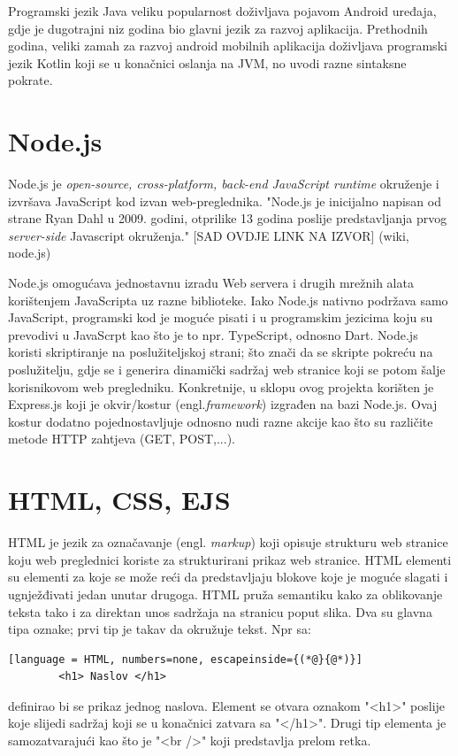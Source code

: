 \documentclass[times, utf8, zavrsni, numeric]{fer}
\begin{document}
	Programski jezik Java veliku popularnost doživljava pojavom Android uređaja, gdje je dugotrajni niz godina bio glavni jezik za razvoj aplikacija. Prethodnih godina, veliki zamah za razvoj android mobilnih aplikacija doživljava programski jezik 
	Kotlin koji se u konačnici oslanja na JVM, no uvodi razne sintaksne pokrate. 
	
	
	
	\section{Node.js}
	Node.js je \textit{open-source, cross-platform, back-end JavaScript runtime} okruženje i izvršava JavaScript kod izvan web-preglednika. "Node.js je inicijalno napisan od strane  Ryan Dahl u 2009. godini, otprilike 13 godina poslije predstavljanja
	prvog  \textit{server-side} Javascript okruženja." [SAD OVDJE LINK NA IZVOR] (wiki, node.js)
	
	Node.js omogućava jednostavnu izradu Web servera i drugih mrežnih alata korištenjem JavaScripta uz razne biblioteke. Iako Node.js nativno podržava samo JavaScript, programski kod je moguće pisati i u programskim jezicima koju su prevodivi u JavaScrpt kao 
	što je to npr. TypeScript, odnosno Dart. Node.js koristi skriptiranje na poslužiteljskoj strani; što znači da se skripte pokreću na poslužitelju, gdje se i generira dinamički sadržaj web stranice koji se potom šalje korisnikovom web pregledniku. 
	Konkretnije, u sklopu ovog projekta korišten je Express.js koji je okvir/kostur (engl.\textit{framework}) izgrađen na bazi Node.js. Ovaj kostur dodatno pojednostavljuje odnosno nudi razne akcije kao što su različite metode HTTP zahtjeva (GET, POST,...).
	
	
	\section{HTML, CSS, EJS}
	HTML je jezik za označavanje (engl. \textit{markup}) koji opisuje strukturu web stranice koju web preglednici koriste za strukturirani prikaz web stranice. HTML elementi su elementi za koje se može reći da predstavljaju blokove koje je moguće slagati
	i ugnježđivati jedan unutar drugoga. HTML pruža semantiku kako za oblikovanje teksta tako i za direktan unos sadržaja na stranicu poput slika.
	Dva su glavna tipa oznake; prvi tip je takav da okružuje tekst. Npr sa: 
		\begin{lstlisting}[language = HTML, numbers=none, escapeinside={(*@}{@*)}]
		<h1> Naslov </h1>
		\end{lstlisting}
		definirao bi se prikaz jednog naslova. Element se otvara oznakom "<h1>" poslije koje slijedi sadržaj koji se u konačnici zatvara sa "</h1>". Drugi tip elementa je samozatvarajući kao što je "<br />" koji predstavlja prelom retka.
\end{document}
